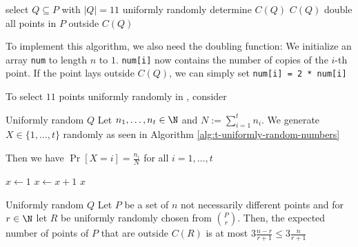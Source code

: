\begin{algorithm}
    \caption{Smallest Enclosing Circle $C(P)$ randomized}
    \begin{algorithmic}[1]
                \State select $Q \subseteq P$ with $|Q| = 11$ uniformly randomly
                \State determine $C(Q)$
                    \State \Return $C(Q)$
                \EndIf
                \State double all points in $P$ outside $C(Q)$
            \EndWhile
        \EndProcedure
    \end{algorithmic}
\end{algorithm}
To implement this algorithm, we also need the doubling function: We initialize an array \verb|num| to length $n$ to $1$. \verb|num[i]| now contains the number of copies of the $i$-th point. If the point lays outside $C(Q)$, we can simply set \verb|num[i] = 2 * num[i]|

\newpage
To select $11$ points uniformly randomly in , consider
\begin{lemma}[]{Uniformly random $Q$}
    Let $n_1, \ldots, n_t \in \N$ and $N := \sum_{i = 1}^{t} n_i$. We generate $X \in \{1, \ldots, t\}$ randomly as seen in Algorithm \ref{alg:t-uniformly-random-numbers}

    Then we have $\Pr[X = i] = \frac{n_i}{N}$ for all $i = 1, \ldots, t$
\end{lemma}

\begin{algorithm}
    \caption{Choose uniformly random number}\label{alg:t-uniformly-random-numbers}
    \begin{algorithmic}[1]
            \State {}
            \State $x \gets 1$
                \State $x \gets x + 1$
            \EndWhile
            \State \Return $x$
        \EndProcedure
    \end{algorithmic}
\end{algorithm}

\begin{lemma}[]{Uniformly random $Q$}
    Let $P$ be a set of $n$ not necessarily different points and for $r \in \N$ let $R$ be uniformly randomly chosen from ${P \choose r}$. Then, the expected number of points of $P$ that are outside $C(R)$ is at most $3 \frac{n - r}{r + 1} \leq 3\frac{n}{r + 1}$
\end{lemma}

